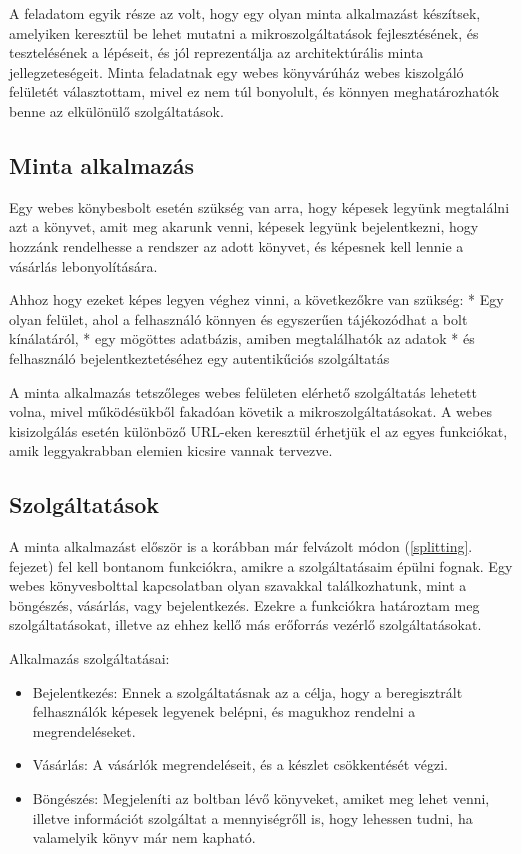 \documentclass[11pt,magyar,a4paper,twoside,]{report}
\providecommand{\tightlist}{%
  \setlength{\itemsep}{0pt}\setlength{\parskip}{0pt}}
\begin{document}
A feladatom egyik része az volt, hogy egy olyan minta alkalmazást
készítsek, amelyiken keresztül be lehet mutatni a mikroszolgáltatások
fejlesztésének, és tesztelésének a lépéseit, és jól reprezentálja az
architektúrális minta jellegzeteségeit. Minta feladatnak egy webes
könyvárúház webes kiszolgáló felületét választottam, mivel ez nem túl
bonyolult, és könnyen meghatározhatók benne az elkülönülő
szolgáltatások.

\subsection{Minta alkalmazás}\label{minta-alkalmazuxe1s}

Egy webes könybesbolt esetén szükség van arra, hogy képesek legyünk
megtalálni azt a könyvet, amit meg akarunk venni, képesek legyünk
bejelentkezni, hogy hozzánk rendelhesse a rendszer az adott könyvet, és
képesnek kell lennie a vásárlás lebonyolítására.

Ahhoz hogy ezeket képes legyen véghez vinni, a következőkre van szükség:
* Egy olyan felület, ahol a felhasználó könnyen és egyszerűen
tájékozódhat a bolt kínálatáról, * egy mögöttes adatbázis, amiben
megtalálhatók az adatok * és felhasználó bejelentkeztetéséhez egy
autentikűciós szolgáltatás

A minta alkalmazás tetszőleges webes felületen elérhető szolgáltatás
lehetett volna, mivel működésükből fakadóan követik a
mikroszolgáltatásokat. A webes kisizolgálás esetén különböző URL-eken
keresztül érhetjük el az egyes funkciókat, amik leggyakrabban elemien
kicsire vannak tervezve.

\subsection{Szolgáltatások}\label{szolguxe1ltatuxe1sok}

A minta alkalmazást először is a korábban már felvázolt módon
(\ref{splitting}. fejezet) fel kell bontanom funkciókra, amikre a
szolgáltatásaim épülni fognak. Egy webes könyvesbolttal kapcsolatban
olyan szavakkal találkozhatunk, mint a böngészés, vásárlás, vagy
bejelentkezés. Ezekre a funkciókra határoztam meg szolgáltatásokat,
illetve az ehhez kellő más erőforrás vezérlő szolgáltatásokat.

Alkalmazás szolgáltatásai:

\begin{itemize}
\tightlist
\item
  Bejelentkezés: Ennek a szolgáltatásnak az a célja, hogy a
  beregisztrált felhasználók képesek legyenek belépni, és magukhoz
  rendelni a megrendeléseket.
\item
  Vásárlás: A vásárlók megrendeléseit, és a készlet csökkentését végzi.
\item
  Böngészés: Megjeleníti az boltban lévő könyveket, amiket meg lehet
  venni, illetve információt szolgáltat a mennyiségrőll is, hogy
  lehessen tudni, ha valamelyik könyv már nem kapható.
\end{itemize}
\end{document}
